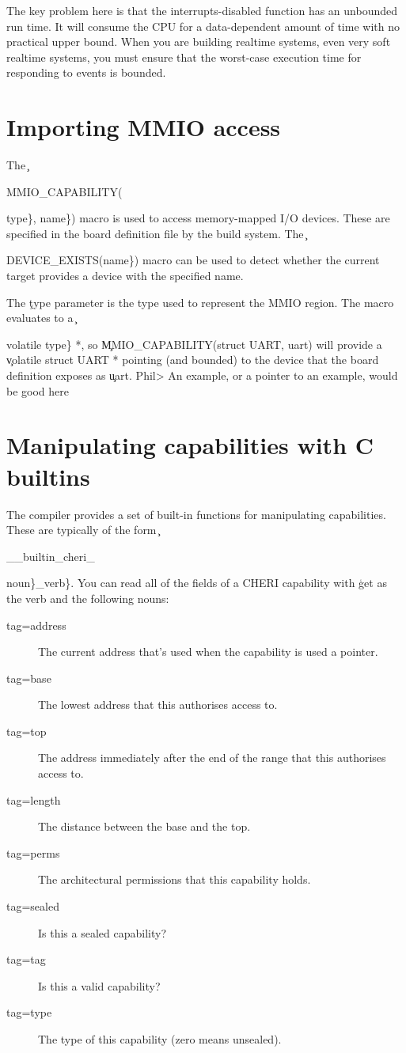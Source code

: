 {{The key problem here is that the interrupts-disabled function has an unbounded run time.
It will consume the CPU for a data-dependent amount of time with no practical upper bound.
When you are building realtime systems, even very soft realtime systems, you must ensure that the worst-case execution time for responding to events is bounded.

\section{Importing MMIO access}

The \c{MMIO_CAPABILITY({type\}, {name\})} macro is used to access memory-mapped I/O devices.
These are specified in the board definition file by the build system.
The \c{DEVICE_EXISTS({name\})} macro can be used to detect whether the current target provides a device with the specified name.

The \c{type} parameter is the type used to represent the MMIO region.
The macro evaluates to a \c{volatile {type\} *}, so \c{MMIO_CAPABILITY(struct UART, uart)} will provide a \c{volatile struct UART *} pointing (and bounded) to the device that the board definition exposes as \c{uart}.
Phil> An example, or a pointer to an example, would be good here

\section{Manipulating capabilities with C builtins}

The compiler provides a set of built-in functions for manipulating capabilities.
These are typically of the form \c{__builtin_cheri_{noun\}_{verb\}}.
You can read all of the fields of a CHERI capability with \c{get} as the verb and the following nouns:

\begin{description}
	\item[tag=address]{The current address that's used when the capability is used a pointer.}
	\item[tag=base]{The lowest address that this authorises access to.}
	\item[tag=top]{The address immediately after the end of the range that this authorises access to.}
	\item[tag=length]{The distance between the base and the top.}
	\item[tag=perms]{The architectural permissions that this capability holds.}
	\item[tag=sealed]{Is this a sealed capability?}
	\item[tag=tag]{Is this a valid capability?}
	\item[tag=type]{The type of this capability (zero means unsealed).}
\end{description}

}}}}}}}}
